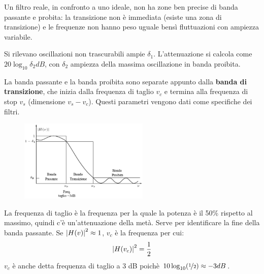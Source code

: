 Un filtro reale, in confronto a uno ideale, non ha zone ben precise di banda passante e probita: la transizione non è immediata (esiste una zona di transizione) e le frequenze non hanno peso uguale bensì fluttuazioni con ampiezza variabile. 

Si rilevano oscillazioni non trascurabili ampie $\delta_1$. L'attenuazione si calcola come $20\log_{10} \delta_2 dB$, con $\delta_2$ ampiezza della massima oscillazione in banda proibita. 

La banda passante e la banda proibita sono separate appunto dalla \textbf{banda di transizione}, che inizia dalla frequenza di taglio $v_c$ e termina alla frequenza di stop $v_s$ (dimensione $v_s - v_c$). Questi parametri vengono dati come specifiche dei filtri. 

\begin{figure}
	\vspace{-15pt}
	\includegraphics[width=0.55\textwidth]{Lezioni/Immagini/taglio}
	\vspace{-50pt}
\end{figure}

La frequenza di taglio è la frequenza per la quale la potenza è il 50\% rispetto al massimo, quindi c'è un'attenuazione della metà. Serve per identificare la fine della banda passante. Se $\left|H(v)\right|^2 \approx 1$, $v_c$ è la frequenza per cui:
$$\left|H(v_c)\right|^2 = \frac{1}{2}$$
$v_c$ è anche detta frequenza di taglio a 3 dB poichè $10\log_{10}(\nicefrac{1}{2}) \approx -3 dB$.
\bigskip
\bigskip